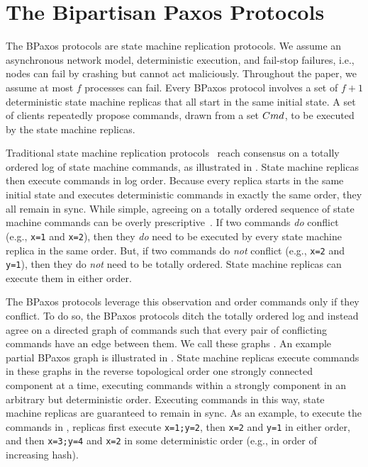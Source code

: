 \section{The Bipartisan Paxos Protocols}
The BPaxos protocols are state machine replication protocols. We assume an
asynchronous network model, deterministic execution, and fail-stop
failures, i.e., nodes can fail by crashing but cannot act maliciously. Throughout the paper, we
assume at most $f$ processes can fail. Every BPaxos protocol involves a set of
$f + 1$ deterministic state machine replicas that all start in the same initial
state. A set of clients repeatedly propose commands, drawn from a
set $Cmd$, to be executed by the state machine replicas.



Traditional state machine replication protocols~\cite{liskov2012viewstamped,
lamport1998part} reach consensus on a totally ordered log of state machine
commands, as illustrated in . State machine replicas then
execute commands in log order. Because every replica starts in the same initial
state and executes deterministic commands in exactly the same order,
they all remain in sync.
%
While simple, agreeing on a totally ordered sequence of state machine commands
can be overly prescriptive~\cite{lamport2005generalized, moraru2013there}. If
two commands \emph{do} conflict (e.g., \texttt{x=1} and \texttt{x=2}), then
they \emph{do} need to be executed by every state machine replica in the same
order.  But, if two commands do \emph{not} conflict (e.g., \texttt{x=2} and
\texttt{y=1}), then they do \emph{not} need to be totally ordered. State
machine replicas can execute them in either order.

The BPaxos protocols leverage this observation and order commands only if
they conflict. To do so, the BPaxos protocols ditch the totally ordered log and
instead agree on a directed graph of commands such that every pair of
conflicting commands have an edge between them. We call these graphs
. An example partial BPaxos graph is illustrated
in . State machine replicas execute commands in these graphs
in the reverse topological order one strongly connected component at a time,
executing commands within a strongly component in an arbitrary but
deterministic order. Executing commands in this way, state machine replicas are
guaranteed to remain in sync. As an example, to execute the commands in
, replicas first execute \texttt{x=1;y=2}, then \texttt{x=2}
and \texttt{y=1} in either order, and then \texttt{x=3;y=4} and \texttt{x=2} in
some deterministic order (e.g., in order of increasing hash).

